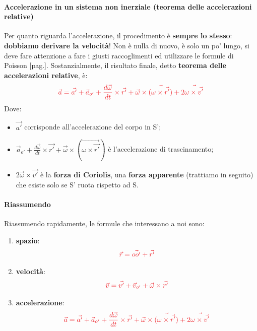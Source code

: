             \paragraph{Accelerazione in un sistema non inerziale (teorema delle accelerazioni relative)}
                Per quanto riguarda l'accelerazione, il procedimento è \textbf{sempre lo stesso}: \textbf{dobbiamo derivare la velocità}! Non è nulla di nuovo, è solo un po' lungo, si deve fare attenzione a fare i giusti raccoglimenti ed utilizzare le formule di Poisson [pag.\pageref{Poisson}]. Sostanzialmente, il risultato finale, detto \textbf{teorema delle accelerazioni relative}, è:
                \begin{align*}
                    \textcolor{Red}{\vec{a} = \vec{a'} + \vec{a}_{o'}+\frac{d\vec{\omega}}{dt}\times \vec{r'}+\vec{\omega}\times(\vec{\omega\times\vec{r'}})+2\vec{\omega\times\vec{v'}}}
                \end{align*}
                Dove:
                \begin{itemize}
                    \item $\vec{a'}$ corrisponde all'accelerazione del corpo in S';
                    \item $\vec{a}_{o'}+\frac{d\vec{\omega}}{dt}\times \vec{r'}+\vec{\omega}\times(\vec{\omega\times\vec{r'}})$ è l'accelerazione di trascinamento;
                    \item $2\vec{\omega}\times\vec{v'}$ è la \textbf{forza di Coriolis}, una \textbf{forza apparente} (trattiamo in seguito) che esiste solo se S' ruota rispetto ad S.
                \end{itemize}


            \paragraph{Riassumendo}
                Riassumendo rapidamente, le formule che interessano a noi sono:
                \begin{enumerate}
                    \item \textbf{spazio}:
                        \begin{align*}
                            \textcolor{Red}{\vec{r}=\vec{oo'}+\vec{r'}}
                        \end{align*}
                    \item \textbf{velocità}:
                        \begin{align*}
                            \textcolor{Red}{\vec{v}=\vec{v'} + \vec{v}_{o'} + \vec{\omega}\times\vec{r'}}
                        \end{align*}
                    \item \textbf{accelerazione}:
                        \begin{align*}
                            \textcolor{Red}{\vec{a} = \vec{a'} + \vec{a}_{o'}+\frac{d\vec{\omega}}{dt}\times \vec{r'}+\vec{\omega}\times(\vec{\omega\times\vec{r'}})+2\vec{\omega\times\vec{v'}}}
                        \end{align*}
                \end{enumerate}

